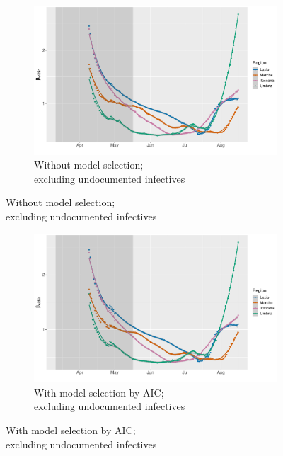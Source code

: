 \documentclass[12pt]{article}
\begin{document}
\begin{appendices}
		\begin{figure}[H]
    	    \centering
    	    \begin{subfigure}{\textwidth}
    	      \centering
    	      \includegraphics[width=0.94\linewidth]{output/model_within_lag14_betawithin_Centro (IT)_rollingwindow30.pdf}
    	      \caption{Without model selection; \\ excluding undocumented infectives}
    	      \label{fig:beta_within_over_time_centro_lowsample_regular}
    	    \end{subfigure}\newline
        \end{figure}
        \begin{figure}[H]\ContinuedFloat
    	    \begin{subfigure}{\textwidth}
    	      \centering
    	      \includegraphics[width=0.94\linewidth]{output/model_within_lag14_betawithin_Centro (IT)_aic_rollingwindow30.pdf}
    	      \caption{With model selection by AIC; \\ excluding undocumented infectives}
    	      \label{fig:beta_within_over_time_centro_lowsample_aic}

\end{subfigure}
\end{figure}
\end{appendices}
\end{document}
